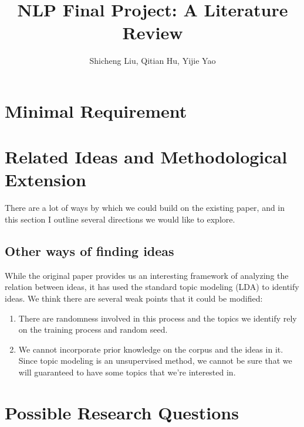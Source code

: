 \documentclass{article}
\title{NLP Final Project: A Literature Review}
\author{Shicheng Liu, Qitian Hu, Yijie Yao}
\begin{document}
\maketitle 

\section{Minimal Requirement}


\section{Related Ideas and Methodological Extension}


There are a lot of ways by which we could build on the existing paper, and in this section I outline several directions we would like to explore.

\subsection{Other ways of finding ideas}

While the original paper provides us an interesting framework of analyzing the relation between ideas, it has used the standard topic modeling (LDA) to identify ideas. We think there are several weak points that it could be modified:

\begin{enumerate}
  \item There are randomness involved in this process and the topics we identify rely on the training process and random seed.
  \item We cannot incorporate prior knowledge on the corpus and the ideas in it. Since topic modeling is an unsupervised method, we cannot be sure that we will guaranteed to have some topics that we're interested in. 
\end{enumerate}





\section{Possible Research Questions}









\end{document}

